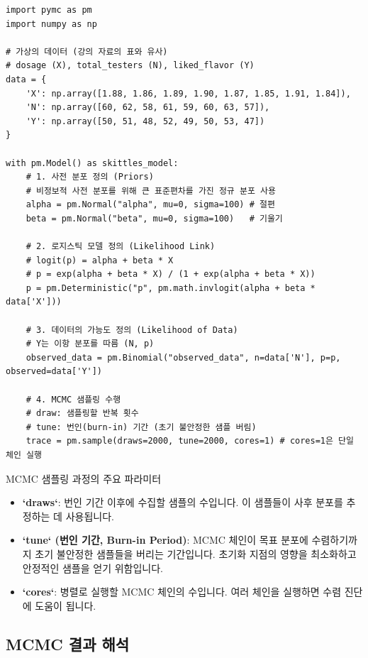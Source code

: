 \documentclass[11pt,a4paper]{article}
\begin{document}
\begin{lstlisting}[caption={`pymc`를 이용한 MCMC 모델 설정 및 샘플링 예시}, label={lst:pymc_mcmc}]
import pymc as pm
import numpy as np

# 가상의 데이터 (강의 자료의 표와 유사)
# dosage (X), total_testers (N), liked_flavor (Y)
data = {
    'X': np.array([1.88, 1.86, 1.89, 1.90, 1.87, 1.85, 1.91, 1.84]),
    'N': np.array([60, 62, 58, 61, 59, 60, 63, 57]),
    'Y': np.array([50, 51, 48, 52, 49, 50, 53, 47])
}

with pm.Model() as skittles_model:
    # 1. 사전 분포 정의 (Priors)
    # 비정보적 사전 분포를 위해 큰 표준편차를 가진 정규 분포 사용
    alpha = pm.Normal("alpha", mu=0, sigma=100) # 절편
    beta = pm.Normal("beta", mu=0, sigma=100)   # 기울기

    # 2. 로지스틱 모델 정의 (Likelihood Link)
    # logit(p) = alpha + beta * X
    # p = exp(alpha + beta * X) / (1 + exp(alpha + beta * X))
    p = pm.Deterministic("p", pm.math.invlogit(alpha + beta * data['X']))

    # 3. 데이터의 가능도 정의 (Likelihood of Data)
    # Y는 이항 분포를 따름 (N, p)
    observed_data = pm.Binomial("observed_data", n=data['N'], p=p, observed=data['Y'])

    # 4. MCMC 샘플링 수행
    # draw: 샘플링할 반복 횟수
    # tune: 번인(burn-in) 기간 (초기 불안정한 샘플 버림)
    trace = pm.sample(draws=2000, tune=2000, cores=1) # cores=1은 단일 체인 실행
\end{lstlisting}

\begin{mybox}{MCMC 샘플링 과정의 주요 파라미터}
\begin{itemize}
    \item \textbf{`draws`}: 번인 기간 이후에 수집할 샘플의 수입니다. 이 샘플들이 사후 분포를 추정하는 데 사용됩니다.
    \item \textbf{`tune` (번인 기간, Burn-in Period)}: MCMC 체인이 목표 분포에 수렴하기까지 초기 불안정한 샘플들을 버리는 기간입니다. 초기화 지점의 영향을 최소화하고 안정적인 샘플을 얻기 위함입니다.
    \item \textbf{`cores`}: 병렬로 실행할 MCMC 체인의 수입니다. 여러 체인을 실행하면 수렴 진단에 도움이 됩니다.
\end{itemize}
\end{mybox}

\subsection*{MCMC 결과 해석}
\end{document}
